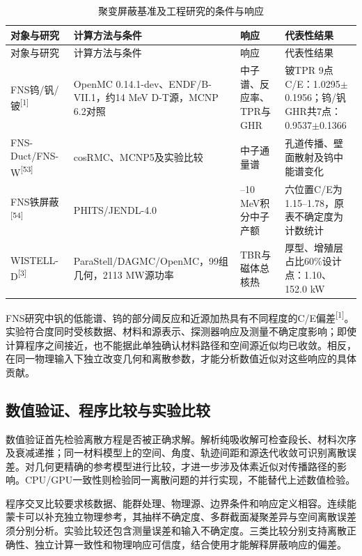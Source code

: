 \documentclass[UTF8, zihao=-4, fontset=none, a4paper]{ctexart}
\newcommand{\upcite}[1]{\textsuperscript{[#1]}}
\begin{document}
\begin{longtable}{@{}>{\raggedright\arraybackslash}p{}>{\raggedright\arraybackslash}p{}>{\raggedright\arraybackslash}p{}>{\raggedright\arraybackslash}p{}@{}}
\caption{聚变屏蔽基准及工程研究的条件与响应}\label{tab:5}\\
\toprule
对象与研究 & 计算方法与条件 & 响应 & 代表性结果 \\
\midrule
\endfirsthead
\toprule
对象与研究 & 计算方法与条件 & 响应 & 代表性结果 \\
\midrule
\endhead
\bottomrule
\endlastfoot
FNS钨/钒/铍\upcite{1} & OpenMC 0.14.1-dev、ENDF/B-VII.1，约14 MeV D-T源，MCNP 6.2对照 & 中子谱、反应率、TPR与GHR & 铍TPR 9点C/E：1.0295$\pm$0.1956；钨/钒GHR共7点：0.9537$\pm$0.1366 \\
FNS-Duct/FNS-W\upcite{53} & cosRMC、MCNP5及实验比较 & 中子通量谱 & 孔道传播、壁面散射及钨中能谱变化 \\
FNS铁屏蔽\upcite{54} & PHITS/JENDL-4.0 & 0.003--10 MeV积分中子产额 & 六位置C/E为1.15--1.78，原表不确定度为计数统计 \\
WISTELL-D\upcite{3} & ParaStell/\allowbreak DAGMC/\allowbreak OpenMC，99组几何，2113 MW源功率 & TBR与磁体总核热 & 厚型、增殖层占比60\%设计点：1.10、152.0 kW \\
\end{longtable}

FNS研究中钒的低能谱、钨的部分阈反应和近源加热具有不同程度的C/E偏差\upcite{1}。实验符合度同时受核数据、材料和源表示、探测器响应及测量不确定度影响；即使计算程序之间接近，也不能据此单独确认材料路径和空间源近似均已收敛。相反，在同一物理输入下独立改变几何和离散参数，才能分析数值近似对这些响应的具体贡献。

\subsection{数值验证、程序比较与实验比较}

数值验证首先检验离散方程是否被正确求解。解析纯吸收解可检查段长、材料次序及衰减递推；同一材料模型上的空间、角度、轨迹间距和源迭代收敛可识别离散误差。对几何更精确的参考模型进行比较，才进一步涉及体素近似对传播路径的影响。CPU/GPU一致性则检验同一离散问题的并行实现，不能替代上述数值检验。

程序交叉比较要求核数据、能群处理、物理源、边界条件和响应定义相容。连续能蒙卡可以补充独立物理参考，其抽样不确定度、多群截面凝聚差异与空间离散误差须分别分析。实验比较还包含测量误差和输入不确定度。三类比较分别支持离散正确性、独立计算一致性和物理响应可信度，结合使用才能解释屏蔽响应的偏差。
\end{document}
